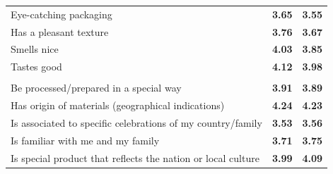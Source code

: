 \documentclass[]{article}
\begin{document}
\begin{tabular}{lll}
\hspace{1em}Eye-catching packaging & \bgroup\fontsize{12}{14}\selectfont \textcolor[HTML]{2A788E}{\textbf{3.65}}\egroup{} & \bgroup\fontsize{10}{12}\selectfont \textcolor[HTML]{3A538B}{\textbf{3.55}}\egroup{}\\
\hspace{1em}Has a pleasant texture & \bgroup\fontsize{12}{14}\selectfont \textcolor[HTML]{218F8D}{\textbf{3.76}}\egroup{} & \bgroup\fontsize{11}{13}\selectfont \textcolor[HTML]{2D718E}{\textbf{3.67}}\egroup{}\\
\hspace{1em}Smells nice & \bgroup\fontsize{14}{16}\selectfont \textcolor[HTML]{4DC36B}{\textbf{4.03}}\egroup{} & \bgroup\fontsize{13}{15}\selectfont \textcolor[HTML]{1F9A8A}{\textbf{3.85}}\egroup{}\\
\hspace{1em}Tastes good & \bgroup\fontsize{15}{17}\selectfont \textcolor[HTML]{78D152}{\textbf{4.12}}\egroup{} & \bgroup\fontsize{14}{16}\selectfont \textcolor[HTML]{34B679}{\textbf{3.98}}\egroup{}\\
\addlinespace[0.3em]
\multicolumn{3}{l}{\textbf{Traditional value}}\\
\hspace{1em}Be processed/prepared in a special way & \bgroup\fontsize{14}{16}\selectfont \textcolor[HTML]{26AD81}{\textbf{3.91}}\egroup{} & \bgroup\fontsize{13}{15}\selectfont \textcolor[HTML]{20A386}{\textbf{3.89}}\egroup{}\\
\hspace{1em}Has origin of materials (geographical indications) & \bgroup\fontsize{16}{18}\selectfont \textcolor[HTML]{BBDF27}{\textbf{4.24}}\egroup{} & \bgroup\fontsize{16}{18}\selectfont \textcolor[HTML]{BBDF27}{\textbf{4.23}}\egroup{}\\
\hspace{1em}Is associated to specific celebrations of my country/family & \bgroup\fontsize{11}{13}\selectfont \textcolor[HTML]{355F8D}{\textbf{3.53}}\egroup{} & \bgroup\fontsize{10}{12}\selectfont \textcolor[HTML]{39558C}{\textbf{3.56}}\egroup{}\\
\hspace{1em}Is familiar with me and my family & \bgroup\fontsize{12}{14}\selectfont \textcolor[HTML]{25838E}{\textbf{3.71}}\egroup{} & \bgroup\fontsize{12}{14}\selectfont \textcolor[HTML]{26828E}{\textbf{3.75}}\egroup{}\\
\hspace{1em}Is special product that reflects the nation or local culture & \bgroup\fontsize{14}{16}\selectfont \textcolor[HTML]{3EBC73}{\textbf{3.99}}\egroup{} & \bgroup\fontsize{15}{17}\selectfont \textcolor[HTML]{66CB5D}{\textbf{4.09}}\egroup{}\\
\bottomrule
\end{tabular}
\end{document}
